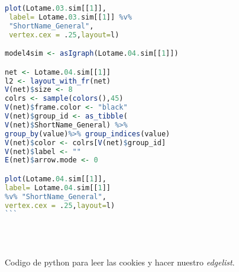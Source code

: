 \begin{lstlisting}[language=R]
plot(Lotame.03.sim[[1]], 
 label= Lotame.03.sim[[1]] %v% 
 "ShortName_General",
 vertex.cex = .25,layout=l)

model4sim <- asIgraph(Lotame.04.sim[[1]])

net <- Lotame.04.sim[[1]]
l2 <- layout_with_fr(net)
V(net)$size <- 8
colrs <- sample(colors(),45)
V(net)$frame.color <- "black"
V(net)$group_id <- as_tibble(
V(net)$ShortName_General) %>% 
group_by(value)%>% group_indices(value) 
V(net)$color <- colrs[V(net)$group_id]
V(net)$label <- "" 
E(net)$arrow.mode <- 0

plot(Lotame.04.sim[[1]], 
label= Lotame.04.sim[[1]] 
%v% "ShortName_General",
vertex.cex = .25,layout=l)
```





\end{lstlisting}

Codigo de python para leer las cookies y hacer nuestro \textit{edgelist}.

